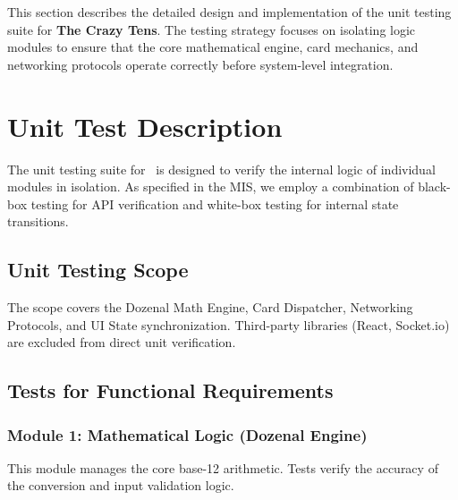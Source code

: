 \documentclass[12pt, titlepage]{article}
\begin{document}
This section describes the detailed design and implementation of the unit testing suite for \textbf{The Crazy Tens}. The testing strategy focuses on isolating logic modules to ensure that the core mathematical engine, card mechanics, and networking protocols operate correctly before system-level integration.

\section{Unit Test Description}

The unit testing suite for \progname\ is designed to verify the internal logic of individual modules in isolation. As specified in the MIS, we employ a combination of black-box testing for API verification and white-box testing for internal state transitions.

\subsection{Unit Testing Scope}
The scope covers the Dozenal Math Engine, Card Dispatcher, Networking Protocols, and UI State synchronization. Third-party libraries (React, Socket.io) are excluded from direct unit verification.

\subsection{Tests for Functional Requirements}

\subsubsection{Module 1: Mathematical Logic (Dozenal Engine)}
This module manages the core base-12 arithmetic. Tests verify the accuracy of the conversion and input validation logic.
\end{document}
